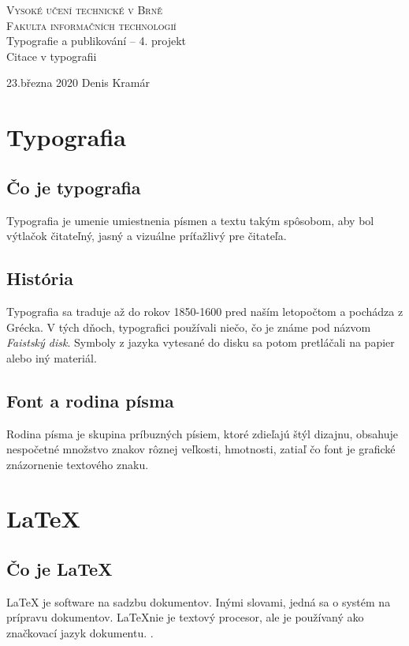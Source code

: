 \documentclass[a4paper, 11pt]{article}
\begin{document}
\begin{titlepage}
     \begin{center}
        {\Huge\textsc{Vysoké učení technické v Brně \\[0.3em]}
        \huge\textsc {Fakulta informačních technologií}}
        \\[80mm]
        {\LARGE Typografie a publikování – 4. projekt \\[0.3em]
        \Huge{Citace v typografii}}
        \vfill
        \end{center}
        {\Large 23.března 2020 \hfill Denis Kramár}
\end{titlepage}

\section{Typografia}
    \subsection{Čo je typografia}
        Typografia je umenie umiestnenia písmen a textu takým spôsobom, aby bol výtlačok čitateľný, jasný a vizuálne príťažlivý pre čitateľa. \cite{Typography}
    
    \subsection{História}
        Typografia sa traduje až do rokov 1850-1600 pred naším letopočtom a pochádza z Grécka. V tých dňoch, typografici používali niečo, čo je známe pod názvom \textit{Faistský disk}. Symboly z jazyka vytesané do disku sa potom pretláčali na papier alebo iný materiál. \cite{Mixner:2012}
        
    \subsection{Font a rodina písma}
        Rodina písma je skupina príbuzných písiem, ktoré zdieľajú štýl dizajnu, obsahuje nespočetné množstvo znakov rôznej veľkosti, hmotnosti, zatiaľ čo font je grafické znázornenie textového znaku. \cite{Font}

\section{\LaTeX}
    \subsection{Čo je \LaTeX}
        \LaTeX{} je software na sadzbu dokumentov. Inými slovami, jedná sa o systém na prípravu dokumentov. \LaTeX nie je textový procesor, ale je používaný ako značkovací jazyk dokumentu. \cite{Kottwitz:2011}.
        
\end{document}
